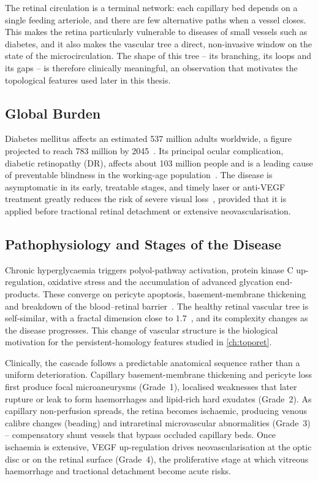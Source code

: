 The retinal circulation is a terminal network: each capillary bed depends on a single
feeding arteriole, and there are few alternative paths when a vessel closes. This makes
the retina particularly vulnerable to diseases of small vessels such as diabetes, and it
also makes the vascular tree a direct, non-invasive window on the state of the
microcirculation. The shape of this tree -- its branching, its loops and its gaps -- is
therefore clinically meaningful, an observation that motivates the topological features
used later in this thesis.



\subsection{Global Burden}

Diabetes mellitus affects an estimated 537 million adults worldwide, a figure projected
to reach 783 million by 2045~\cite{idf2021atlas}. Its principal ocular complication,
diabetic retinopathy (DR), affects about 103 million people and is a leading cause of
preventable blindness in the working-age population~\cite{teo2021global,cheung2010dr}.
The disease is asymptomatic in its early, treatable stages, and timely laser or
anti-VEGF treatment greatly reduces the risk of severe visual loss~\cite{cheung2010dr},
provided that it is applied before tractional retinal detachment or extensive
neovascularisation.

\subsection{Pathophysiology and Stages of the Disease}
\label{sec:patho}

Chronic hyperglycaemia triggers polyol-pathway activation, protein kinase C
up-regulation, oxidative stress and the accumulation of advanced glycation end-products.
These converge on pericyte apoptosis, basement-membrane thickening and breakdown of the
blood--retinal barrier~\cite{cheung2010dr}. The healthy retinal vascular tree is
self-similar, with a fractal dimension close to $1.7$~\cite{masters2004fractal}, and its
complexity changes as the disease progresses. This change of vascular structure is the
biological motivation for the persistent-homology features studied in \cref{ch:toporet}.

Clinically, the cascade follows a predictable anatomical sequence rather than a uniform
deterioration. Capillary basement-membrane thickening and pericyte loss first produce
focal microaneurysms (Grade~1), localised weaknesses that later rupture or leak to form
haemorrhages and lipid-rich hard exudates (Grade~2). As capillary non-perfusion spreads,
the retina becomes ischaemic, producing venous calibre changes (beading) and
intraretinal microvascular abnormalities (Grade~3) -- compensatory shunt vessels that
bypass occluded capillary beds. Once ischaemia is extensive, VEGF up-regulation drives
neovascularisation at the optic disc or on the retinal surface (Grade~4), the
proliferative stage at which vitreous haemorrhage and tractional detachment become
acute risks.

